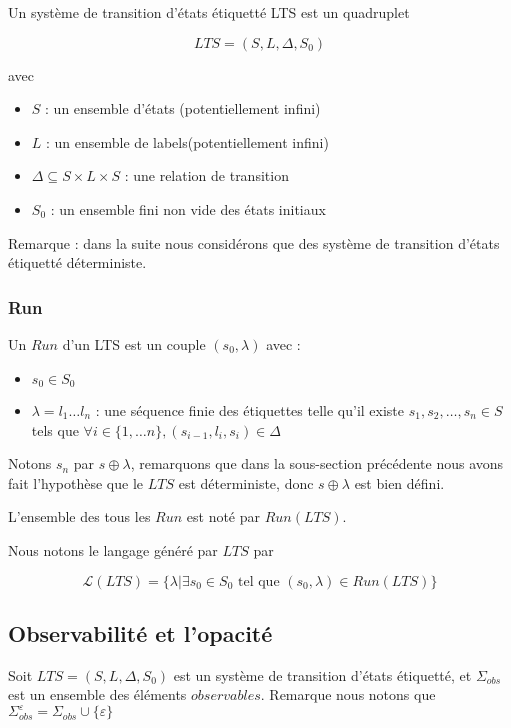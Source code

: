 \documentclass[10pt,a4paper]{article}
\begin{document}
Un syst\`eme de transition d'\'etats \'etiquett\'e LTS est un quadruplet 

$$LTS = (S,L,\Delta,S_0)$$

avec
\begin{itemize}
	\item $S$ : un ensemble d'\'etats (potentiellement infini)
	\item $L$ : un ensemble de labels(potentiellement infini)
	\item $\Delta \subseteq S\times L \times S$ : une relation de transition
	\item $S_0$ : un ensemble fini non vide des \'etats initiaux 
\end{itemize}

Remarque : dans la suite nous consid\'erons que des syst\`eme de transition d'\'etats \'etiquett\'e d\'eterministe.

\subsubsection{Run}

Un $Run$ d'un LTS est un couple $(s_0,\lambda)$ avec :

\begin{itemize}
	\item $s_0 \in S_0$
	\item $\lambda = l_1 \dots l_n$ : une s\'equence finie des \'etiquettes telle qu'il existe $s_1,s_2,\dots ,s_n \in S$ tels que $\forall i \in \{1, \dots n\}, (s_{i-1},l_i,s_i) \in \Delta$ 
\end{itemize}

Notons $s_n$ par $s\oplus \lambda$, remarquons que dans la sous-section pr\'ec\'edente nous avons fait l'hypoth\`ese que le $LTS$ est d\'eterministe, donc $s\oplus \lambda$ est bien d\'efini.

L'ensemble des tous les $Run$ est not\'e par $Run(LTS)$.

Nous notons le langage g\'en\'er\'e par $LTS$ par 

$$\mathcal{L}(LTS) = \{\lambda | \exists s_0 \in S_0 \mbox{ tel que } (s_0,\lambda) \in Run(LTS)\}$$


\subsection{Observabilit\'e et l'opacit\'e}

Soit $LTS=(S,L,\Delta,S_0)$ est un syst\`eme de transition d'\'etats \'etiquett\'e, et $\Sigma_{obs}$ est un ensemble des \'el\'ements $observables$. Remarque nous notons que $\Sigma_{obs}^{\varepsilon} = \Sigma_{obs} \cup \{\varepsilon\}$
\end{document}
